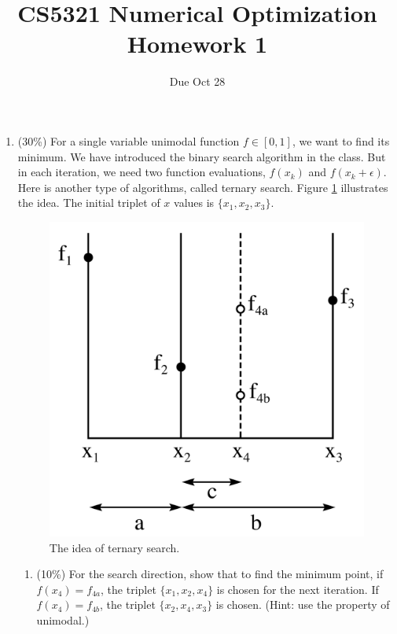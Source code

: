 \documentclass[a4paper,10pt]{article}
\title{CS5321 Numerical Optimization Homework 1}
\author{Due Oct 28}
\date{}
\begin{document}
\maketitle
\begin{enumerate}
 \item (30\%) For a single variable unimodal function $f \in [0, 1]$, we want to find its minimum.  We have introduced the binary search algorithm in the class.  But in each iteration, we need two function evaluations, $f(x_k)$ and $f(x_k+\epsilon)$.  Here is another type of algorithms, called ternary search. Figure \ref{fig1} illustrates the idea.  The initial triplet of $x$ values is $\{x_1, x_2, x_3\}$.   
\begin{figure}[h]
\centering
\includegraphics[scale=0.1]{GoldenSectionSearch.png}
\caption{The idea of ternary search.}
\label{fig1}
\end{figure}




\begin{enumerate}
		\item (10\%) For the search direction, show that to find the minimum point, if $f(x_4)=f_{4a}$, the triplet $\{x_1,x_2,x_4\}$ is chosen for the next iteration. If $f(x_4)=f_{4b}$, the triplet $\{x_2, x_4, x_3\}$ is chosen. (Hint: use the property of unimodal.)
		

\end{enumerate}
\end{enumerate}
\end{document}
